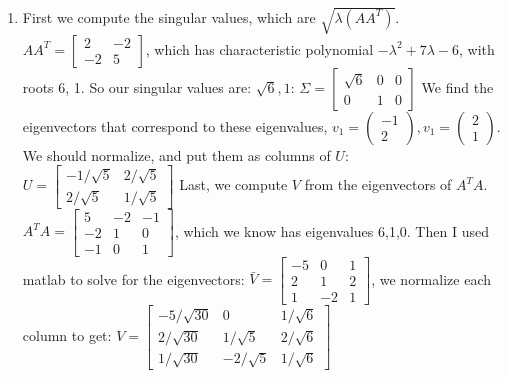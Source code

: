 \documentclass[11pt]{article}
\begin{document}
\soln

\begin{enumerate}
    \item First we compute the singular values, which are $\sqrt{\lambda(AA^T)}$.
    $AA^T = \begin{bmatrix}
        2 & -2 \\ -2 & 5
    \end{bmatrix}$, which has characteristic polynomial $-\lambda^2 + 7\lambda - 6$,
    with roots 6, 1. So our singular values are: $\sqrt{6}, 1$: $\Sigma = \begin{bmatrix}
        \sqrt{6} & 0 & 0 \\ 0 & 1 & 0
    \end{bmatrix}$
    We find the eigenvectors that correspond to these eigenvalues,
    $v_1 = \begin{pmatrix}
        -1 \\ 2
    \end{pmatrix}, v_1 = \begin{pmatrix}
        2 \\ 1
    \end{pmatrix}$.
    We should normalize, and put them as columns of $U$:
    $U = \begin{bmatrix}
        -1/\sqrt{5} & 2 / \sqrt{5} \\
        2/\sqrt{5} & 1/\sqrt{5}
    \end{bmatrix}$
    Last, we compute $V$ from the eigenvectors of $A^TA$.
    $A^TA = \begin{bmatrix}
        5 & -2 & -1 \\ -2 & 1 & 0 \\ -1 & 0 & 1
    \end{bmatrix}$, which we know has eigenvalues 6,1,0.
    Then I used matlab to solve for the eigenvectors:
    $\bar{V} = \begin{bmatrix}
        -5 & 0 & 1\\2 &1&2\\1&-2&1
    \end{bmatrix}$, we normalize each column to get:
    $V = \begin{bmatrix}
        -5/\sqrt{30} & 0 & 1/\sqrt{6}\\
        2/\sqrt{30} &1/\sqrt{5}&2/\sqrt{6}\\
        1/\sqrt{30}&-2/\sqrt{5}&1/\sqrt{6}
    \end{bmatrix}$


\end{enumerate}
\end{document}
